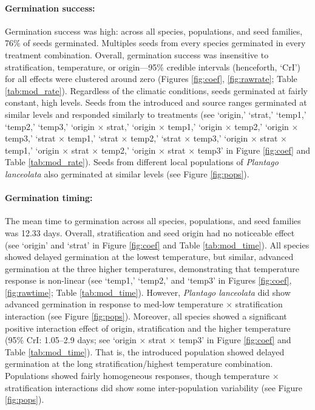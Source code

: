\documentclass[11pt]{article}\usepackage[]{graphicx}\usepackage[]{color}
\begin{document}
	\paragraph{Germination success:} Germination success was high: across all species, populations, and seed families, 76\% of seeds germinated. Multiples seeds from every species germinated in every treatment combination. Overall, germination success was insensitive to stratification, temperature, or origin---95\% credible intervals (henceforth, `CrI') for all effects were clustered around zero (Figures \ref{fig:coef}, \ref{fig:rawrate}; Table \ref{tab:mod_rate}). Regardless of the climatic conditions, seeds germinated at fairly constant, high levels. Seeds from the introduced and source ranges germinated at similar levels and responded similarly to treatments (see `origin,' `strat,' `temp1,' `temp2,' `temp3,' `origin $\times$ strat,' `origin $\times$ temp1,' `origin $\times$ temp2,' `origin $\times$ temp3,' `strat $\times$ temp1,' `strat $\times$ temp2,' `strat $\times$ temp3,' `origin $\times$ strat $\times$ temp1,' `origin $\times$ strat $\times$ temp2,' `origin $\times$ strat $\times$ temp3' in Figure \ref{fig:coef} and Table \ref{tab:mod_rate}). Seeds from different local populations of \textit{Plantago lanceolata} also germinated at similar levels (see Figure \ref{fig:pops}).
	\paragraph{Germination timing:} The mean time to germination across all species, populations, and seed families was 12.33 days.   Overall, stratification and seed origin had no noticeable effect (see `origin' and `strat' in Figure \ref{fig:coef} and Table \ref{tab:mod_time}). All species showed delayed germination at the lowest temperature, but similar, advanced germination at the  three higher temperatures, demonstrating that temperature response is non-linear  (see `temp1,' `temp2,' and `temp3' in Figures \ref{fig:coef}, \ref{fig:rawtime}; Table \ref{tab:mod_time}). However, \textit{Plantago lanceolata} did show advanced germination in response to med-low temperature $\times$ stratification interaction (see Figure \ref{fig:pops}).  Moreover, all species showed a significant positive interaction effect of origin, stratification and the higher temperature (95\% CrI: 1.05--2.9 days; see `origin $\times$ strat $\times$ temp3' in Figure \ref{fig:coef} and Table \ref{tab:mod_time}). That is, the introduced population showed delayed germination at the long stratification/highest temperature combination. Populations showed fairly homogeneous responses, though temperature $\times$ stratification interactions did show some inter-population variability (see Figure \ref{fig:pops}). 
\end{document}
